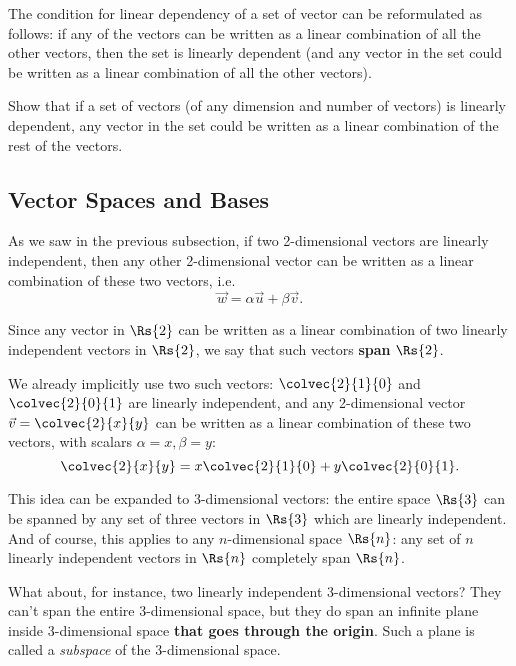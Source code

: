 \begin{warning}
  The condition for linear dependency of a set of vector can be reformulated as follows: if any of the vectors can be written as a linear combination of all the other vectors, then the set is linearly dependent (and any vector in the set could be written as a linear combination of all the other vectors).
\end{warning}

\begin{challange}
  Show that if a set of vectors (of any dimension and number of vectors) is linearly dependent, any vector in the set could be written as a linear combination of the rest of the vectors.
\end{challange}

\subsection{Vector Spaces and Bases}
As we saw in the previous subsection, if two 2-dimensional vectors are linearly independent, then any other 2-dimensional vector can be written as a linear combination of these two vectors, i.e.
\begin{equation*}
  \vec{w} = \alpha\vec{u} + \beta\vec{v}.
\end{equation*}

Since any vector in $\Rs{2}$ can be written as a linear combination of two linearly independent vectors in $\Rs{2}$, we say that such vectors \textbf{span} $\Rs{2}$.

We already implicitly use two such vectors: $\colvec{2}{1}{0}$ and $\colvec{2}{0}{1}$ are linearly independent, and any 2-dimensional vector $\vec{v}=\colvec{2}{x}{y}$ can be written as a linear combination of these two vectors, with scalars $\alpha=x, \beta=y$:
\begin{equation*}
  \colvec{2}{x}{y} = x\colvec{2}{1}{0} + y\colvec{2}{0}{1}.
\end{equation*}

This idea can be expanded to 3-dimensional vectors: the entire space $\Rs{3}$ can be spanned by any set of three vectors in $\Rs{3}$ which are linearly independent. And of course, this applies to any $n$-dimensional space $\Rs{n}$: any set of $n$ linearly independent vectors in $\Rs{n}$ completely span $\Rs{n}$.

What about, for instance, two linearly independent 3-dimensional vectors? They can't span the entire 3-dimensional space, but they do span an infinite plane inside 3-dimensional space \textbf{that goes through the origin}. Such a plane is called a \emph{subspace} of the 3-dimensional space.

